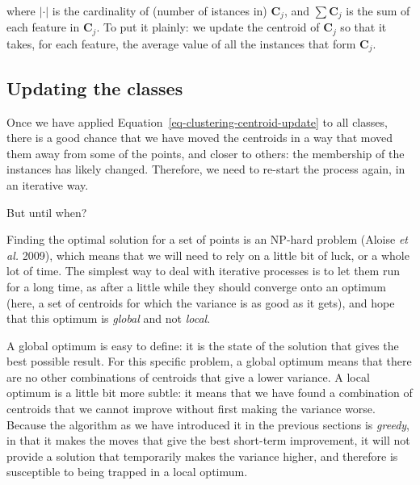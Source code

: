 \documentclass[
  letterpaper,
]{scrbook}
\begin{document}
where \(|\cdot|\) is the cardinality of (number of istances in)
\(\mathbf{C}_j\), and \(\sum \mathbf{C}_j\) is the sum of each feature
in \(\mathbf{C}_j\). To put it plainly: we update the centroid of
\(\mathbf{C}_j\) so that it takes, for each feature, the average value
of all the instances that form \(\mathbf{C}_j\).

\subsection{Updating the classes}\label{updating-the-classes}


Once we have applied Equation~\ref{eq-clustering-centroid-update} to all
classes, there is a good chance that we have moved the centroids in a
way that moved them away from some of the points, and closer to others:
the membership of the instances has likely changed. Therefore, we need
to re-start the process again, in an iterative way.

But until when?

Finding the optimal solution for a set of points is an NP-hard problem
(Aloise \emph{et al.} 2009), which means that we will need to rely on a
little bit of luck, or a whole lot of time. The simplest way to deal
with iterative processes is to let them run for a long time, as after a
little while they should converge onto an optimum (here, a set of
centroids for which the variance is as good as it gets), and hope that
this optimum is \emph{global} and not \emph{local}.

A global optimum is easy to define: it is the state of the solution that
gives the best possible result. For this specific problem, a global
optimum means that there are no other combinations of centroids that
give a lower variance. A local optimum is a little bit more subtle: it
means that we have found a combination of centroids that we cannot
improve without first making the variance worse. Because the algorithm
as we have introduced it in the previous sections is \emph{greedy}, in
that it makes the moves that give the best short-term improvement, it
will not provide a solution that temporarily makes the variance higher,
and therefore is susceptible to being trapped in a local optimum.
\end{document}
